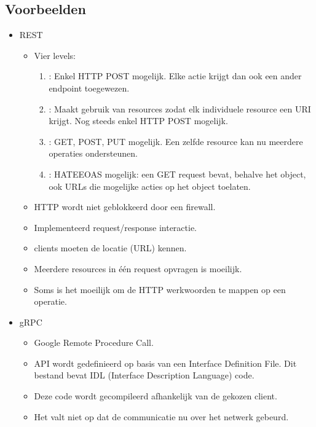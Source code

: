 \documentclass{report}
\begin{document}
	\subsection{Voorbeelden}
	\begin{itemize}
		\item[\info] REST
		\begin{itemize}
			\item[\info] Vier levels:
			\begin{enumerate}
				\item[0]: Enkel HTTP POST mogelijk. Elke actie krijgt dan ook een ander endpoint toegewezen.
				\item[1]: Maakt gebruik van resources zodat elk individuele resource een URI krijgt. Nog steeds enkel HTTP POST mogelijk.
				\item[2]: GET, POST, PUT mogelijk. Een zelfde resource kan nu meerdere operaties ondersteunen.
				\item[3]: HATEEOAS mogelijk: een GET request bevat, behalve het object, ook URLs die mogelijke acties op het object toelaten.
			\end{enumerate}
			\item[\good] HTTP wordt niet geblokkeerd door een firewall.
			\item[\good] Implementeerd request/response interactie.
			\item[\alert] clients moeten de locatie (URL) kennen.
			\item[\alert] Meerdere resources in één request opvragen is moeilijk. 
			\item[\alert] Soms is het moeilijk om de HTTP werkwoorden te mappen op een operatie.
		\end{itemize}
		\item[\info] gRPC
		\begin{itemize}
			\item[\info] Google Remote Procedure Call.
			\item[\info] API wordt gedefinieerd op basis van een Interface Definition File. Dit bestand bevat IDL (Interface Description Language) code.
			\item[\info] Deze code wordt gecompileerd afhankelijk van de gekozen client.
			\item[\alert] Het valt niet op dat de communicatie nu over het netwerk gebeurd.
		\end{itemize}
	\end{itemize}
\end{document}
